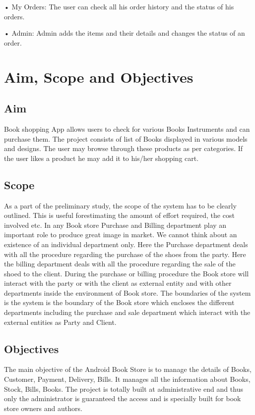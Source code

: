 •	My Orders: The user can check all his order history and the status of his orders.

•	Admin: Admin adds the items and their details and changes the status of an order. 

\section{Aim, Scope and Objectives}
\subsection{Aim}
Book shopping App allows users to check for various Books Instruments and can purchase them. The project consists of list of Books displayed in various models and designs. The user may browse through these products as per categories. If the user likes a product he may add it to his/her shopping cart.
\subsection{Scope}
As a part of the preliminary study, the scope of the system has to be clearly outlined. This is useful
forestimating the amount of effort required, the cost involved etc. In any Book store Purchase and Billing
department play an important role to produce great image in market. We cannot think about an existence of an
individual department only. Here the Purchase department deals with all the procedure regarding the purchase
of the shoes from the party. Here the billing department deals with all the procedure regarding the sale of the
shoed to the client. During the purchase or billing procedure the Book store will interact with the party or with
the client as external entity and with other departments inside the environment of Book store. The boundaries of
the system is the system is the boundary of the Book store which encloses the different departments including
the purchase and sale department which interact with the external entities as Party and Client.
\subsection{Objectives}
The main objective of the Android Book Store is to manage the details of Books, Customer, Payment, Delivery, Bills. 
It manages all the information about Books, Stock, Bills, Books. 
The project is totally built at administrative end and thus only the administrator is guaranteed the access and is specially built for book store owners and authors.